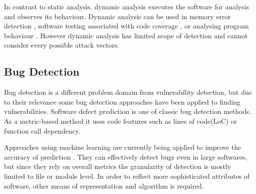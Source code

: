In contrast to static analysis, dynamic analysis executes the software for analysis and observes its behaviour.
Dynamic analysis can be used in memory error detection \cite{valgrind}, software testing associated with code coverage \cite{huang2015code},
or analysing program behaviour \cite{newsome2005dynamic, enck2014taintdroid}.
However dynamic analysis has limited scope of detection and cannot consider every possible attack vectors.

\subsection{Bug Detection}

Bug detection is a different problem domain from vulnerability detection, but due to their relevance some bug detection approaches have been applied to finding vulnerabilities.
Software defect prediction \cite{khoshgoftaar2009attribute, lessmann2008benchmarking} is one of classic bug detection methods.
As a metric-based method it uses code features such as lines of code(LoC) or function call dependency.

Approaches using machine learning are currently being applied to improve the accuracy of prediction \cite{gao2011choosing, wang2016automatically}.
They can effectively detect bugs even in large softwares, but since they rely on overall metrics the granularity of detection is mostly limited to file or module level.
In order to reflect more sophisticated attributes of software, other means of representation and algorithm is required.

